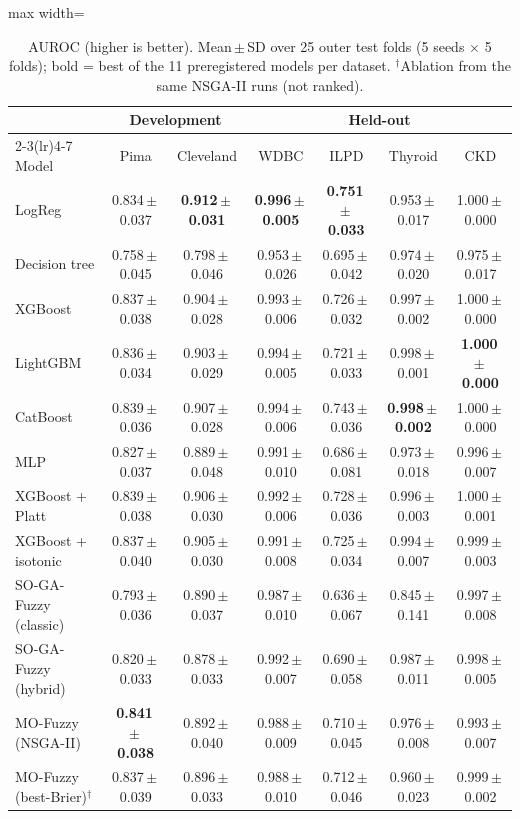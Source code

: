 \begin{table}[t]
\centering
\scriptsize
\setlength{\tabcolsep}{3pt}
\caption{AUROC (higher is better). Mean\,$\pm$\,SD over 25 outer test folds (5 seeds $\times$ 5 folds); bold = best of the 11 preregistered models per dataset. $^\dagger$Ablation from the same NSGA-II runs (not ranked).}
\label{tab:auroc}
\begin{adjustbox}{max width=\linewidth}
\begin{tabular}{lcccccc}
\toprule
 & \multicolumn{2}{c}{Development} & \multicolumn{4}{c}{Held-out} \\
\cmidrule(lr){2-3}\cmidrule(lr){4-7}
Model & Pima & Cleveland & WDBC & ILPD & Thyroid & CKD \\
\midrule
LogReg & 0.834\,$\pm$\,0.037 & \textbf{0.912\,$\pm$\,0.031} & \textbf{0.996\,$\pm$\,0.005} & \textbf{0.751\,$\pm$\,0.033} & 0.953\,$\pm$\,0.017 & 1.000\,$\pm$\,0.000 \\
Decision tree & 0.758\,$\pm$\,0.045 & 0.798\,$\pm$\,0.046 & 0.953\,$\pm$\,0.026 & 0.695\,$\pm$\,0.042 & 0.974\,$\pm$\,0.020 & 0.975\,$\pm$\,0.017 \\
XGBoost & 0.837\,$\pm$\,0.038 & 0.904\,$\pm$\,0.028 & 0.993\,$\pm$\,0.006 & 0.726\,$\pm$\,0.032 & 0.997\,$\pm$\,0.002 & 1.000\,$\pm$\,0.000 \\
LightGBM & 0.836\,$\pm$\,0.034 & 0.903\,$\pm$\,0.029 & 0.994\,$\pm$\,0.005 & 0.721\,$\pm$\,0.033 & 0.998\,$\pm$\,0.001 & \textbf{1.000\,$\pm$\,0.000} \\
CatBoost & 0.839\,$\pm$\,0.036 & 0.907\,$\pm$\,0.028 & 0.994\,$\pm$\,0.006 & 0.743\,$\pm$\,0.036 & \textbf{0.998\,$\pm$\,0.002} & 1.000\,$\pm$\,0.000 \\
MLP & 0.827\,$\pm$\,0.037 & 0.889\,$\pm$\,0.048 & 0.991\,$\pm$\,0.010 & 0.686\,$\pm$\,0.081 & 0.973\,$\pm$\,0.018 & 0.996\,$\pm$\,0.007 \\
XGBoost + Platt & 0.839\,$\pm$\,0.038 & 0.906\,$\pm$\,0.030 & 0.992\,$\pm$\,0.006 & 0.728\,$\pm$\,0.036 & 0.996\,$\pm$\,0.003 & 1.000\,$\pm$\,0.001 \\
XGBoost + isotonic & 0.837\,$\pm$\,0.040 & 0.905\,$\pm$\,0.030 & 0.991\,$\pm$\,0.008 & 0.725\,$\pm$\,0.034 & 0.994\,$\pm$\,0.007 & 0.999\,$\pm$\,0.003 \\
SO-GA-Fuzzy (classic) & 0.793\,$\pm$\,0.036 & 0.890\,$\pm$\,0.037 & 0.987\,$\pm$\,0.010 & 0.636\,$\pm$\,0.067 & 0.845\,$\pm$\,0.141 & 0.997\,$\pm$\,0.008 \\
SO-GA-Fuzzy (hybrid) & 0.820\,$\pm$\,0.033 & 0.878\,$\pm$\,0.033 & 0.992\,$\pm$\,0.007 & 0.690\,$\pm$\,0.058 & 0.987\,$\pm$\,0.011 & 0.998\,$\pm$\,0.005 \\
MO-Fuzzy (NSGA-II) & \textbf{0.841\,$\pm$\,0.038} & 0.892\,$\pm$\,0.040 & 0.988\,$\pm$\,0.009 & 0.710\,$\pm$\,0.045 & 0.976\,$\pm$\,0.008 & 0.993\,$\pm$\,0.007 \\
\midrule
MO-Fuzzy (best-Brier)$^\dagger$ & 0.837\,$\pm$\,0.039 & 0.896\,$\pm$\,0.033 & 0.988\,$\pm$\,0.010 & 0.712\,$\pm$\,0.046 & 0.960\,$\pm$\,0.023 & 0.999\,$\pm$\,0.002 \\
\bottomrule
\end{tabular}
\end{adjustbox}
\end{table}
